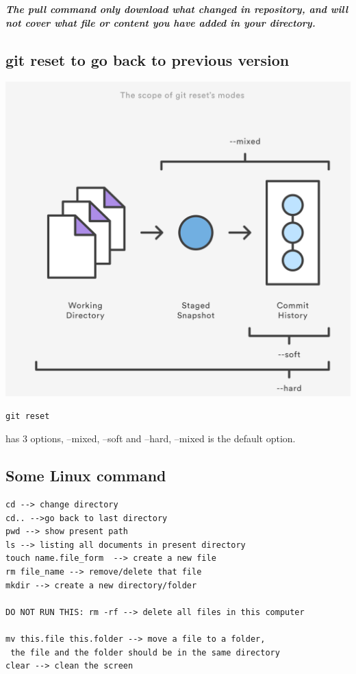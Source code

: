 \documentclass[UTF8]{article}
\begin{document}
\textbf{\textit{The pull command only download what changed in repository, and will not cover what file or content you have added in your directory. }}

\subsection{git reset to go back to previous version}

\begin{center}
\includegraphics[scale=0.3]{gitreset}
\end{center}

\begin{verbatim}
git reset 
\end{verbatim}
has 3 options, --mixed, --soft and --hard, --mixed is the default option. 

\subsection{Some Linux command}
\begin{verbatim}
cd --> change directory
cd.. -->go back to last directory
pwd --> show present path
ls --> listing all documents in present directory
touch name.file_form  --> create a new file 
rm file_name --> remove/delete that file
mkdir --> create a new directory/folder

DO NOT RUN THIS: rm -rf --> delete all files in this computer

mv this.file this.folder --> move a file to a folder,
 the file and the folder should be in the same directory
clear --> clean the screen
\end{verbatim}
\end{document}
